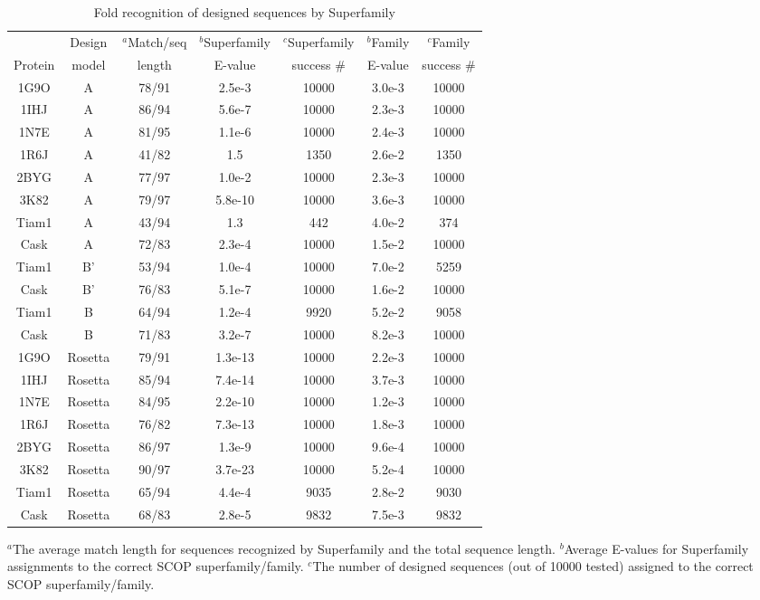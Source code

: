 \documentclass[12pt]{article}
\begin{document}
\begin{table}[h]                            
\caption{Fold recognition of designed sequences by Superfamily}
\label{tab:superfamily}                      
\begin{center} 
\begin{tabular}{ccccccc} \hline \hline  
        & Design  & $^a$Match/seq & $^b$Superfamily & $^c$Superfamily & $^b$Family & $^c$Family     \\
Protein & model   & length        & E-value         & success \#     & E-value    & success \# \\ \hline
1G9O    &  A      & 78/91 & 2.5e-3  & 10000 & 3.0e-3 & 10000 \\
1IHJ    &  A      & 86/94 & 5.6e-7  & 10000 & 2.3e-3 & 10000 \\
1N7E    &  A      & 81/95 & 1.1e-6  & 10000 & 2.4e-3 & 10000 \\
1R6J    &  A      & 41/82 & 1.5     &  1350 & 2.6e-2 &  1350 \\
2BYG    &  A      & 77/97 & 1.0e-2  & 10000 & 2.3e-3 & 10000 \\
3K82    &  A      & 79/97 & 5.8e-10 & 10000 & 3.6e-3 & 10000 \\ 
Tiam1   &  A      & 43/94 & 1.3     &   442 & 4.0e-2 &   374 \\
Cask    &  A      & 72/83 & 2.3e-4  & 10000 & 1.5e-2 & 10000 \\ \hline
Tiam1   &  B'     & 53/94 & 1.0e-4  & 10000 & 7.0e-2 &  5259 \\
Cask    &  B'     & 76/83 & 5.1e-7  & 10000 & 1.6e-2 & 10000 \\ \hline
Tiam1   &  B      & 64/94 & 1.2e-4  &  9920 & 5.2e-2 & 9058 \\
Cask    &  B      & 71/83 & 3.2e-7  & 10000 & 8.2e-3 & 10000 \\ \hline
1G9O    & Rosetta & 79/91 & 1.3e-13 & 10000 & 2.2e-3 & 10000 \\
1IHJ    & Rosetta & 85/94 & 7.4e-14 & 10000 & 3.7e-3 & 10000 \\ 
1N7E    & Rosetta & 84/95 & 2.2e-10 & 10000 & 1.2e-3 & 10000 \\
1R6J    & Rosetta & 76/82 & 7.3e-13 & 10000 & 1.8e-3 & 10000 \\
2BYG    & Rosetta & 86/97 & 1.3e-9  & 10000 & 9.6e-4 & 10000 \\
3K82    & Rosetta & 90/97 & 3.7e-23 & 10000 & 5.2e-4 & 10000 \\ 
Tiam1   & Rosetta & 65/94 & 4.4e-4  &  9035 & 2.8e-2 &  9030 \\
Cask    & Rosetta & 68/83 & 2.8e-5  &  9832 & 7.5e-3 &  9832 \\ \hline
\end{tabular}  
\end{center} 
{\footnotesize \noindent $^a$The average match length for sequences recognized by Superfamily and the total sequence length.
$^b$Average E-values for Superfamily assignments to the correct SCOP superfamily/family.
$^c$The number of designed sequences (out of 10000 tested) assigned to the correct SCOP superfamily/family.
}
\end{table}
\end{document}
